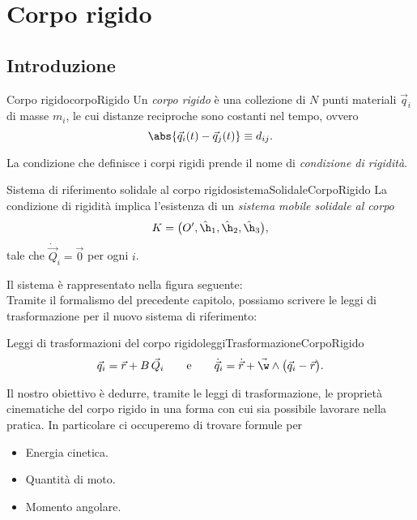 \chapter{Corpo rigido}
%
%
\section{Introduzione}

\begin{defn}{Corpo rigido}{corpoRigido}
	Un \emph{corpo rigido} è una collezione di \(N\) punti materiali \(\vec{q}_i\) di masse \(m_i\), le cui distanze reciproche sono costanti nel tempo, ovvero
	\[
		\abs{\vec{q}_i(t)-\vec{q}_j(t)} \equiv d_{ij}.
	\]
\end{defn}

\begin{notz}
	La condizione che definisce i corpi rigidi prende il nome di \emph{condizione di rigidità}.
\end{notz}

\begin{defn}{Sistema di riferimento solidale al corpo rigido}{sistemaSolidaleCorpoRigido}
	La condizione di rigidità implica l'esistenza di un \emph{sistema mobile solidale al corpo}
	\[
		K = \big(O',\hat{\h}_1,\hat{\h}_2,\hat{\h}_3\big),
	\]
	tale che \(\dot{\vec{Q}}_i=\vec{0}\) per ogni \(i\).
\end{defn}
\noindent
Il sistema è rappresentato nella figura seguente:
\[
	
\]
Tramite il formalismo del precedente capitolo, possiamo scrivere le leggi di trasformazione per il nuovo sistema di riferimento:

\begin{remark}{Leggi di trasformazioni del corpo rigido}{leggiTrasformazioneCorpoRigido}
	\[
		\vec{q}_i = \vec{r}+B\,\vec{Q}_i \qquad\text{e}\qquad \dot{\vec{q}}_i = \dot{\vec{r}}+\vec{\w}\wedge\big(\vec{q}_i-\vec{r}\big).
	\]
\end{remark}
\noindent
Il nostro obiettivo è dedurre, tramite le leggi di trasformazione, le proprietà cinematiche del corpo rigido in una forma con cui sia possibile lavorare nella pratica.
In particolare ci occuperemo di trovare formule per
\begin{itemize}
	\item Energia cinetica.
	\item Quantità di moto.
	\item Momento angolare.
\end{itemize}

